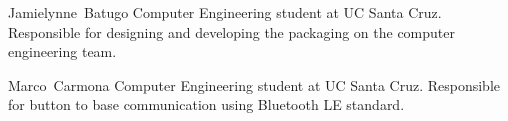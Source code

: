 \documentclass[journal,compsoc]{IEEEtran}
\begin{document}
%
%
%

%

\begin{IEEEbiography}
 {Jamielynne~Batugo}
  Computer Engineering student at UC Santa Cruz. Responsible for designing and developing the packaging on the computer engineering team. 
\end{IEEEbiography}

\begin{IEEEbiography}
{Marco~Carmona}
  Computer Engineering student at UC Santa Cruz. Responsible for button to base communication using Bluetooth LE standard.
\end{IEEEbiography}
\end{document}
